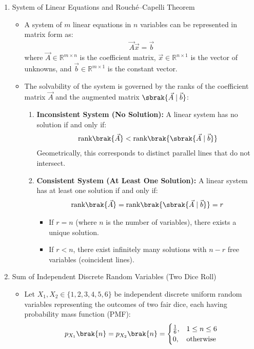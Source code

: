\begin{enumerate}[label=\thesubsection.\arabic*, ref=\thesubsection.\theenumi]
\item System of Linear Equations and Rouch\'{e}--Capelli Theorem
\begin{itemize}
\item A system of $m$ linear equations in $n$ variables can be represented in matrix form as:
\begin{align}
\vec{A}\vec{x} = \vec{b} \label{eq:linear_sys}
\end{align}
where $\vec{A} \in \mathbb{R}^{m \times n}$ is the coefficient matrix, $\vec{x} \in \mathbb{R}^{n \times 1}$ is the vector of unknowns, and $\vec{b} \in \mathbb{R}^{m \times 1}$ is the constant vector.
\item The solvability of the system is governed by the ranks of the coefficient matrix $\vec{A}$ and the augmented matrix $\sbrak{\vec{A} \mid \vec{b}}$:
\begin{enumerate}
    \item \textbf{Inconsistent System (No Solution):} A linear system has no solution if and only if:
    \begin{align}
    \text{rank}\brak{\vec{A}} < \text{rank}\brak{\sbrak{\vec{A} \mid \vec{b}}} \label{eq:inconsistent_rank}
    \end{align}
    Geometrically, this corresponds to distinct parallel lines that do not intersect.
    \item \textbf{Consistent System (At Least One Solution):} A linear system has at least one solution if and only if:
    \begin{align}
    \text{rank}\brak{\vec{A}} = \text{rank}\brak{\sbrak{\vec{A} \mid \vec{b}}} = r \label{eq:consistent_rank}
    \end{align}
    \begin{itemize}
        \item If $r = n$ (where $n$ is the number of variables), there exists a unique solution.
        \item If $r < n$, there exist infinitely many solutions with $n - r$ free variables (coincident lines).
    \end{itemize}
\end{enumerate}
\end{itemize}

\item Sum of Independent Discrete Random Variables (Two Dice Roll)
\begin{itemize}
\item Let $X_1, X_2 \in \{1, 2, 3, 4, 5, 6\}$ be independent discrete uniform random variables representing the outcomes of two fair dice, each having probability mass function (PMF):
\begin{align}
p_{X_1}\brak{n} = p_{X_2}\brak{n} = \begin{cases} 
\frac{1}{6}, & 1 \le n \le 6 \\ 
0, & \text{otherwise} 
\end{cases} \label{eq:dice_uniform_pmf}
\end{align}


\end{itemize}
\end{enumerate}
